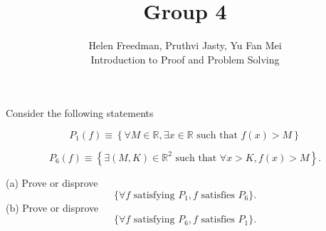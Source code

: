 \documentclass[12pt]{article}
\newenvironment{problem}[2][Problem]{\begin{trivlist}
\item[\hskip \labelsep {\bfseries #1}\hskip \labelsep {\bfseries #2.}]}{\end{trivlist}}
\begin{document}
\title{Group 4}%
\author{Helen Freedman, Pruthvi Jasty, Yu Fan Mei\\ %
Introduction to Proof and Problem Solving} %
\maketitle
\begin{problem}{4} Consider the following statements

    $$P_1 (f) \equiv \left\{ \forall M \in \mathbb{R}, \exists x \in \mathbb{R} \text{ such that } f(x) > M \right\}$$

    $$P_6 (f) \equiv \left\{ \exists (M, K) \in \mathbb{R}^2 \text{ such that } \forall x > K, f(x) > M \right\}.$$

\noindent    (a) Prove or disprove
\begin{equation} \label{eq}
    \{ \forall f \text{ satisfying } P_1, f \text{ satisfies } P_6 \}.
\end{equation}
     (b) Prove or disprove
\begin{equation} \label{eq}
    \{ \forall f \text{ satisfying } P_6, f \text{ satisfies } P_1 \}.
\end{equation}
\end{problem}
\end{document}
